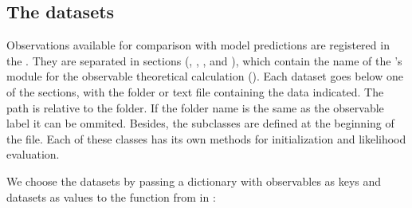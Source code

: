 \documentclass[letterpaper,12pt,english]{sphinxhowto}
\begin{document}
\subsection{The datasets}
\label{\detokenize{thedata:the-datasets}}\label{\detokenize{thedata::doc}}\label{\detokenize{thedata:datasec}}
Observations available for comparison with model predictions are
registered in the
. They
are separated in sections (, , ,  and
), which contain the name of the ’s module for the
observable theoretical calculation ().
Each dataset goes below one of the sections, with the folder or text file
containing the data indicated.
The path is relative to the  folder.
If the folder name is the same as the observable
label it can be ommited. Besides, the  subclasses are defined
at the beginning of the  file. Each of these classes has its own
methods for initialization and likelihood evaluation.

We choose the datasets by passing a dictionary with observables as keys and
datasets as values to the function  from
 in :
\end{document}
